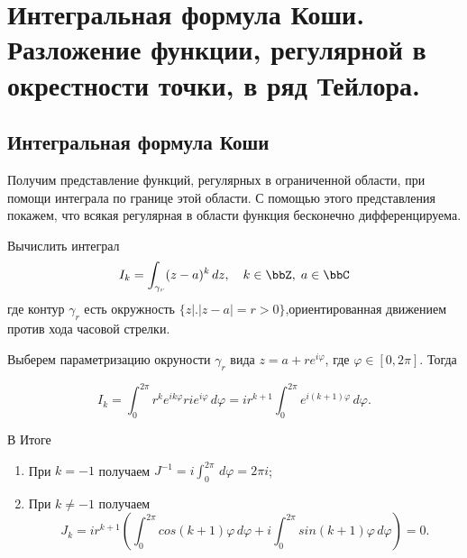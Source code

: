 \chapter{Интегральная формула Коши. Разложение функции, регулярной в окрестности точки, в ряд Тейлора.}
\section{Интегральная формула Коши}

Получим представление функций, регулярных в ограниченной области, при помощи интеграла по границе этой области. С помощью этого представления покажем, что всякая регулярная в области функция бесконечно дифференцируема.


\begin{exmpl}
\label{exmpl1}
Вычислить интеграл 
$$
I_k = \int_{\gamma_r} (z-a)^k\,dz, \quad k \in \bbZ, \; a\in \bbC
$$
где контур $\gamma_r$ есть окружность $\{ z \bigl|\bigr. |z - a| = r>0 \}$,ориентированная движением против хода часовой стрелки.
\end{exmpl}
\begin{solution}
Выберем параметризацию окруности $\gamma_r$ вида $z = a + r e^{i \varphi}$, где $\varphi \in [0, 2\pi]$. Тогда

$$
I_k = \int_{0}^{2 \pi} r^k e^{i k \varphi} r i e^{i \varphi} \,d\varphi = i r^{k+1} \int_{0}^{2 \pi} e^{i (k + 1) \varphi}\,d\varphi.
$$

В Итоге
\begin{enumerate}
\item
При $k = -1$ получаем $J^{-1} = i \int_{0}^{2\pi}\,d\varphi = 2 \pi i$;
\item
При $k \ne -1$ получаем
$$
J_k = i r^{k + 1} \left( \int_{0}^{2 \pi} cos(k + 1) \varphi \,d \varphi + i \int_{0}^{2 \pi} sin(k + 1) \varphi \,d\varphi \right) = 0.
$$
\end{enumerate}
\end{solution}

